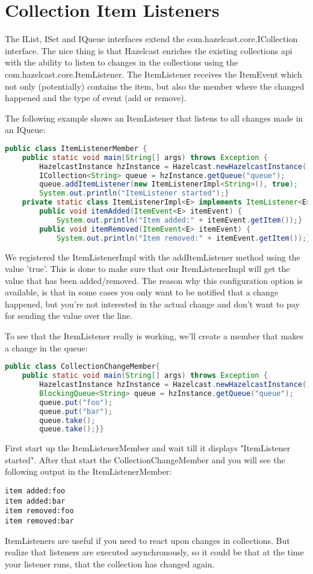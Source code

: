 \section{Collection Item Listeners}
The IList, ISet and IQueue interfaces extend the com.hazelcast.core.ICollection interface. The nice thing is that Hazelcast enriches the existing collections api with the ability to listen to changes in the collections using the com.hazelcast.core.ItemListener. The ItemListener receives the ItemEvent which not only (potentially) contains the item, but also the member where the changed happened and the type of event (add or remove).

The following example shows an ItemListener that listens to all changes made in an IQueue:
\begin{lstlisting}[language=java]
public class ItemListenerMember {
    public static void main(String[] args) throws Exception {
        HazelcastInstance hzInstance = Hazelcast.newHazelcastInstance();
        ICollection<String> queue = hzInstance.getQueue("queue");
        queue.addItemListener(new ItemListenerImpl<String>(), true);
        System.out.println("ItemListener started");}
    private static class ItemListenerImpl<E> implements ItemListener<E> {
        public void itemAdded(ItemEvent<E> itemEvent) {
            System.out.println("Item added:" + itemEvent.getItem());}
        public void itemRemoved(ItemEvent<E> itemEvent) {
            System.out.println("Item removed:" + itemEvent.getItem());}}}
\end{lstlisting}
We registered the ItemListenerImpl with the addItemListener method using the value 'true'. This is done to make sure that our ItemListenerImpl will get the value that has been added/removed. The reason why this configuration option is available, is that in some cases you only want to be notified that a change happened, but you're not interested in the actual change and don't want to pay for sending the value over the line.

To see that the ItemListener really is working, we'll create a member that makes a change in the queue:
\begin{lstlisting}[language=java]
public class CollectionChangeMember{
    public static void main(String[] args) throws Exception {
        HazelcastInstance hzInstance = Hazelcast.newHazelcastInstance();
        BlockingQueue<String> queue = hzInstance.getQueue("queue");
        queue.put("foo");
        queue.put("bar");
        queue.take();
        queue.take();}}
\end{lstlisting}
First start up the ItemListenerMember and wait till it displays "ItemListener started". After that start the CollectionChangeMember and you will see the following output in the ItemListenerMember:
\begin{lstlisting}
item added:foo
item added:bar
item removed:foo
item removed:bar
\end{lstlisting}
ItemListeners are useful if you need to react upon changes in collections. But realize that listeners are executed asynchronously, so it could be that at the time your listener runs, that the collection has changed again. 

